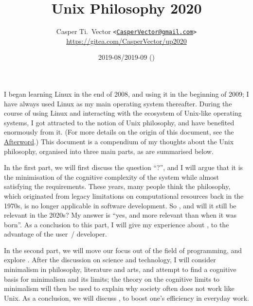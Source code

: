 \documentclass{article}
\begin{document}
\title{\textbf{Unix Philosophy 2020}}
\author{%
	Casper Ti.\ Vector
	\texttt{<\url{CasperVector@gmail.com}>}\\
	\url{https://gitea.com/CasperVector/up2020}%
}
\date{2019-08/2019-09 (\docversion)}
\maketitle
\vspace{\baselineskip}
\tableofcontents


I began learning Linux in the end of 2008, and using it in the beginning
of 2009; I have always used Linux as my main operating system thereafter.
During the course of using Linux and interacting with the ecosystem of
Unix-like operating systems, I got attracted to the notion of Unix
philosophy, and have benefited enormously from it.  (For more details on
the origin of this document, see the \hyperref[sec:afterword]{Afterword}.)
This document is a compendium of my thoughts about the Unix philosophy,
organised into three main parts, as are summarised below.

In the first part, we will first discuss the question ``?'', and I will argue that it is the minimisation
of the cognitive complexity of the system while almost satisfying the
requirements.  These years, many people think the philosophy, which originated
from legacy limitations on computational resources back in the 1970s, is no
longer applicable in software development.  So , and will it still be relevant in the 2020s?  My answer is
``yes, and more relevant than when it was born''.  As a conclusion to this part,
I will give my experience about , to the advantage of the user~/ developer.

In the second part, we will move our focus out of the field of programming, and
explore .  After the discussion on
science and technology, I will consider minimalism in philosophy, literature
and arts, and attempt to find a cognitive basis for minimalism and its limits;
the theory on the cognitive limits to minimalism will then be used to explain
why society often does not work like Unix.  As a conclusion, we will discuss
,
to boost one's efficiency in everyday work.
\end{document}
